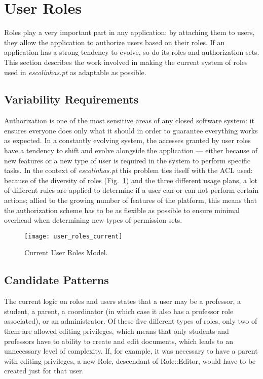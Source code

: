 \section{User Roles}\label{sec:fa_roles}

Roles play a very important part in any application: by attaching them to users, they allow the application to authorize users based on their roles. If an application has a strong tendency to evolve, so do its roles and authorization sets. This section describes the work involved in making the current system of roles used in \emph{escolinhas.pt} as adaptable as possible.

\subsection{Variability Requirements}\label{sec:fa_roles_variability_requirements}

Authorization is one of the most sensitive areas of any closed software system: it ensures everyone does only what it should in order to guarantee everything works as expected. In a constantly evolving system, the accesses granted by user roles have a tendency to shift and evolve alongside the application --- either because of new features or a new type of user is required in the system to perform specific tasks. In the context of \emph{escolinhas.pt} this problem ties itself with the ACL used: because of the diversity of roles (Fig.~\ref{fig:user_roles_current}) and the three different usage plans, a lot of different rules are applied to determine if a user can or can not perform certain actions; allied to the growing number of features of the platform, this means that the authorization scheme has to be as flexible as possible to ensure minimal overhead when determining new types of permission sets.

\begin{figure}[h]
  \centering
  \texttt{[image: user\_roles\_current]}
  \caption{Current User Roles Model.}
  \label{fig:user_roles_current}
\end{figure}

\subsection{Candidate Patterns}\label{sec:fa_roles_candidate_patterns}

The current logic on roles and users states that a user may be a professor, a student, a parent, a coordinator (in which case it also has a professor role associated), or an administrator. Of these five different types of roles, only two of them are allowed editing privileges, which means that only students and professors have to ability to create and edit documents, which leads to an unnecessary level of complexity. If, for example, it was necessary to have a parent with editing privileges, a new Role, descendant of Role::Editor, would have to be created just for that user.

